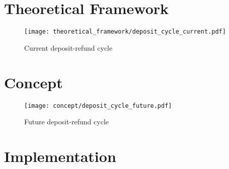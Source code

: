 



\begin{appendices}

\chapter{Theoretical Framework}
\label{appendix:theoreticalFramework}

\pagebreak

\begin{sidewaysfigure}[ht]
    \texttt{[image: theoretical\_framework/deposit\_cycle\_current.pdf]}
    \caption{Current deposit-refund cycle}
	\label{fig:depositCycleCurrent}
\end{sidewaysfigure}

\FloatBarrier


\chapter{Concept}
\label{appendix:concept}

\pagebreak

\begin{sidewaysfigure}[ht]
    \texttt{[image: concept/deposit\_cycle\_future.pdf]}
    \caption{Future deposit-refund cycle}
	\label{fig:depositCycleFuture}
\end{sidewaysfigure}

\FloatBarrier


\chapter{Implementation}

\end{appendices}


